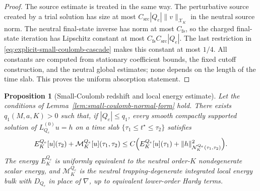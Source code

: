 \documentclass[11pt]{article}
\numberwithin{equation}{section}
\theoremstyle{plain}
\newtheorem{proposition}[theorem]{Proposition}
\theoremstyle{definition}
\theoremstyle{remark}
\begin{document}
\begin{proof}
The source estimate is treated in the same way.  The perturbative source created by a trial solution has size at most \(C_{\mathrm{src}}|Q_e|\|v\|_{\mathcal X_K}\) in the neutral source norm.  The neutral final-state inverse has norm at most \(C_{\mathrm{fs}}\), so the charged final-state iteration has Lipschitz constant at most \(C_{\mathrm{fs}}C_{\mathrm{src}}|Q_e|\).  The last restriction in \eqref{eq:explicit-small-coulomb-cascade} makes this constant at most \(1/4\).  All constants are computed from stationary coefficient bounds, the fixed cutoff construction, and the neutral global estimates; none depends on the length of the time slab.  This proves the uniform absorption statement.

\end{proof}

\begin{proposition}[Small-Coulomb redshift and local energy estimate]\label{prop:small-coulomb-redshift-morawetz}
Let the conditions of Lemma~\ref{lem:small-coulomb-normal-form} hold.  There exists \(q_1(M,a,K)>0\) such that, if \(|Q_e|\le q_1\), every smooth compactly supported solution of \(L_{Q_e}^{(0)}u=h\) on a time slab \(\{\tau_1\le t^\star\le\tau_2\}\) satisfies
\begin{equation}\label{eq:small-coulomb-iled}
 E^{Q_e}_K[u](\tau_2)+\mathcal M^{Q_e}_K[u](\tau_1,\tau_2)
 \le C\Bigl(E^{Q_e}_K[u](\tau_1)+\|h\|^2_{\mathcal N^{Q_e}_K(\tau_1,\tau_2)}\Bigr).
\end{equation}
The energy \(E^{Q_e}_K\) is uniformly equivalent to the neutral order-\(K\) nondegenerate scalar energy, and \(\mathcal M^{Q_e}_K\) is the neutral trapping-degenerate integrated local energy bulk with \(D_{Q_e}\) in place of \(\nabla\), up to equivalent lower-order Hardy terms.
\end{proposition}
\end{document}
